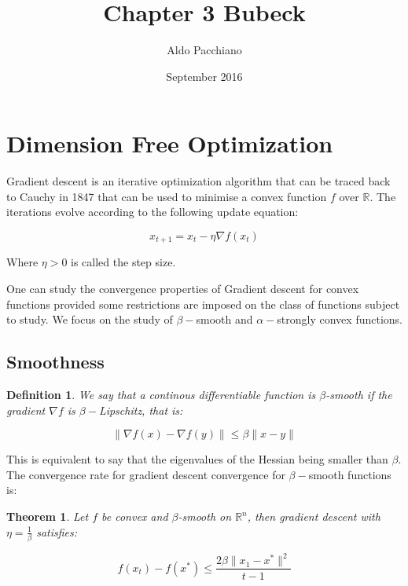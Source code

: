 \documentclass{article}
\title{Chapter 3 Bubeck}
\author{Aldo Pacchiano }
\date{September 2016}
\newtheorem{theorem}{Theorem}
\newtheorem{definition}{Definition}
\begin{document}
\maketitle


\section{Dimension Free Optimization}

Gradient descent is an iterative optimization algorithm that can be traced back to Cauchy in 1847 that can be used to minimise a convex function $f$ over $\mathbb{R}$. The iterations evolve according to the following update equation:

\begin{equation}
    x_{t+1} = x_t - \eta \nabla f(x_t)
\end{equation}

Where $\eta > 0$ is called the step size. 

One can study the convergence properties of Gradient descent for convex functions provided some restrictions are imposed on the class of functions subject to study. We focus on the study of $\beta-$smooth and $\alpha-$strongly convex functions. 

\subsection{Smoothness}

\begin{definition}

We say that a continous differentiable function is $\beta$-smooth if the gradient $\nabla f$ is $\beta-$Lipschitz, that is:

\begin{equation}
    \parallel \nabla f(x) - \nabla f(y) \parallel \leq \beta \parallel x - y \parallel
\end{equation}

\end{definition}

This is equivalent to say that the eigenvalues of the Hessian being smaller than $\beta$. 
The convergence rate for gradient descent convergence for $\beta-$smooth functions is:

\begin{theorem}

Let $f$ be convex and $\beta$-smooth on $\mathbb{R}^n$, then gradient descent with $\eta = \frac{1}{\beta}$ satisfies:

\begin{equation}
f(x_t) - f(x^*) \leq \frac{2\beta \parallel x_1 - x^* \parallel^2}{t-1}
\end{equation}

\end{theorem}
\end{document}
